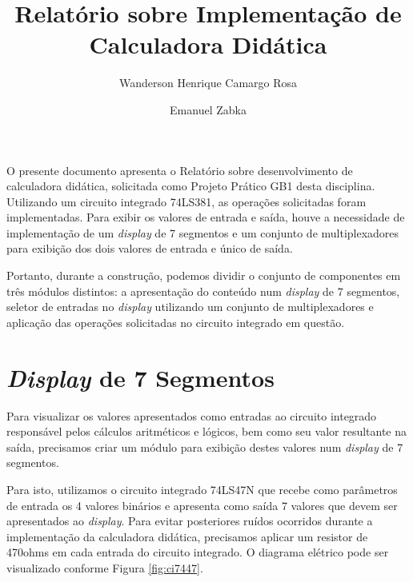 \documentclass{article}
\title{Relatório sobre Implementação de Calculadora Didática}
\author{Wanderson Henrique Camargo Rosa\inst{1} \and{} Emanuel Zabka\inst{1}}
\begin{document}
\maketitle{}

O presente documento apresenta o Relatório sobre desenvolvimento de calculadora
didática, solicitada como Projeto Prático GB1 desta disciplina. Utilizando um
circuito integrado 74LS381, as operações solicitadas foram implementadas. Para
exibir os valores de entrada e saída, houve a necessidade de implementação de um
\emph{display} de 7 segmentos e um conjunto de multiplexadores para exibição dos
dois valores de entrada e único de saída.

Portanto, durante a construção, podemos dividir o conjunto de componentes em
três módulos distintos: a apresentação do conteúdo num \emph{display} de 7
segmentos, seletor de entradas no \emph{display} utilizando um conjunto de
multiplexadores e aplicação das operações solicitadas no circuito integrado em
questão.

\section{\emph{Display} de 7 Segmentos}

Para visualizar os valores apresentados como entradas ao circuito integrado
responsável pelos cálculos aritméticos e lógicos, bem como seu valor resultante
na saída, precisamos criar um módulo para exibição destes valores num
\emph{display} de 7 segmentos.

Para isto, utilizamos o circuito integrado 74LS47N que recebe como parâmetros de
entrada os 4 valores binários e apresenta como saída 7 valores que devem ser
apresentados ao \emph{display}. Para evitar posteriores ruídos ocorridos durante
a implementação da calculadora didática, precisamos aplicar um resistor de
470ohms em cada entrada do circuito integrado. O diagrama elétrico pode ser
visualizado conforme Figura \ref{fig:ci7447}.
\end{document}
